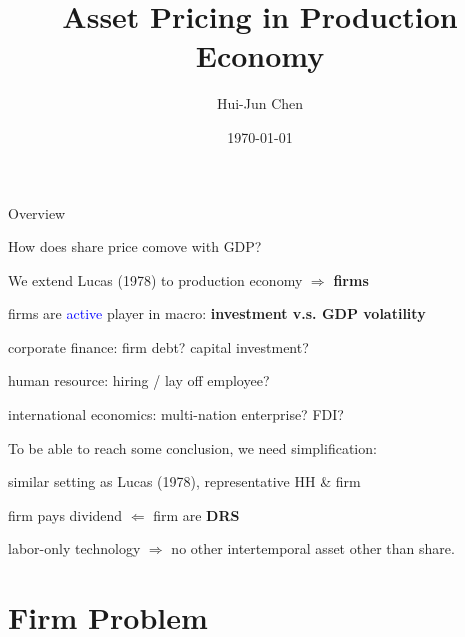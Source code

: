 \documentclass[aspectratio=169,xcolor=dvipsnames]{beamer}
\title[Asset Pricing (Production)]{Asset Pricing in Production Economy}
\author[Hui-Jun Chen]{Hui-Jun Chen}
\institute[NTHU]{National Tsing Hua University}
\date{\today}
\newcommand{\blue}[1]{\textcolor{blue}{#1}}
\let\tempone\itemize
\let\temptwo\enditemize
\renewenvironment{itemize}{\tempone\addtolength{\itemsep}{\fill}}{\temptwo}
\begin{document}

\begin{frame}{Overview}
\label{slide:Overview}
    \begin{center}
        How does share price comove with GDP?
    \end{center}
    \begin{itemize}
        \item We extend Lucas (1978) to production economy $ \Rightarrow  $ \textbf{firms}
        \item firms are \blue{active} player in macro: \textbf{investment v.s. GDP volatility}
        \begin{itemize}
            \item corporate finance: firm debt? capital investment?
            \item human resource: hiring / lay off employee?
            \item international economics: multi-nation enterprise? FDI?
        \end{itemize}
        \item To be able to reach some conclusion, we need simplification:
        \begin{itemize}
            \item similar setting as Lucas (1978), representative HH \& firm
            \item firm pays dividend $ \Leftarrow  $ firm are \textbf{DRS}
            \item labor-only technology $ \Rightarrow  $ no other intertemporal asset other than share.
        \end{itemize}
    \end{itemize}
\end{frame}

\section[Firm]{Firm Problem}
\label{sec:Firm_Problem}
\end{document}
